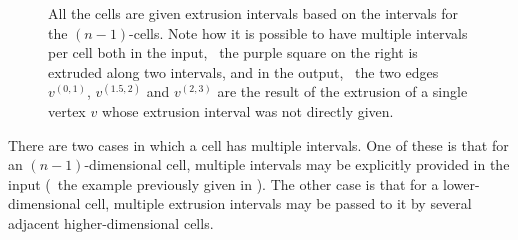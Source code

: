 \begin{figure}[tbp]
\centering
{}
{}
\caption[The extrusion intervals of the lower-dimensional cells]{All the cells are given extrusion intervals based on the intervals for the $(n-1)$-cells.
Note how it is possible to have multiple intervals per cell both in the input, \eg\ the purple square on the right is extruded along two intervals, and in the output, \eg\ the two edges $v^{(0,1)}$, $v^{(1.5,2)}$ and $v^{(2,3)}$ are the result of the extrusion of a single vertex $v$ whose extrusion interval was not directly given.}
\label{fig:extrusion-intervals}
\end{figure}

There are two cases in which a cell has multiple intervals.
One of these is that for an $(n-1)$-dimensional cell, multiple intervals may be explicitly provided in the input (\eg\ the example previously given in ).
The other case is that for a lower-dimensional cell, multiple extrusion intervals may be passed to it by several adjacent higher-dimensional cells.

